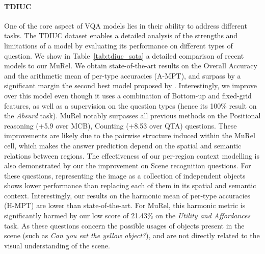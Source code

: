 \documentclass[10pt,twocolumn,letterpaper]{article}
\begin{document}
\paragraph{TDIUC}
One of the core aspect of VQA models lies in their ability to address different tasks. The TDIUC dataset enables a detailed analysis of the strengths and limitations of a model by evaluating its performance on different types of question. We show in Table~\ref{tab:tdiuc_sota} a detailed comparison of recent models to our MuRel. We obtain state-of-the-art results on the Overall Accuracy and the arithmetic mean of per-type accuracies (A-MPT), and surpass by a significant margin the second best model proposed by \cite{Shi_2018_ECCV}. Interestingly, we improve over this model even though it uses a combination of Bottom-up and fixed-grid features, as well as a supervision on the question types (hence its 100\% result on the \textit{Absurd} task).
MuRel notably surpasses all previous methods on the Positional reasoning (+5.9 over MCB), Counting (+8.53 over QTA) questions. These improvements are likely due to the pairwise structure induced within the MuRel cell, which makes the answer prediction depend on the spatial and semantic relations between regions. The effectiveness of our per-region context modelling is also demonstrated by our the improvement on Scene recognition questions. For these questions, representing the image as a collection of independent objects shows lower performance than replacing each of them in its spatial and semantic context.
Interestingly, our results on the harmonic mean of per-type accuracies (H-MPT) are lower than state-of-the-art. For MuRel, this harmonic metric is significantly harmed by our low score of 21.43\% on the \textit{Utility and Affordances} task. As these questions concern the possible usages of objects present in the scene (such as \textit{Can you eat the yellow object?}), and are not directly related to the visual understanding of the scene.
\end{document}
